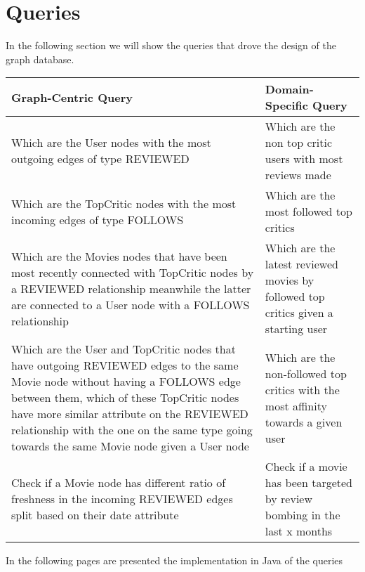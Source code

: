 \section{Queries}
In the following section we will show the queries that drove the design of the graph database.
\begin{center}
\begin{tabular}{|p{8cm} ||p{8cm}|}
\hline
Graph-Centric Query & Domain-Specific Query \\
\hline\hline
Which are the User nodes with the most outgoing edges of type REVIEWED & Which are the non top critic users with most reviews made\\
\hline
Which are the TopCritic nodes with the most incoming edges of type FOLLOWS & Which are the most followed top critics \\
\hline
Which are the Movies nodes that have been most recently connected with TopCritic nodes by a REVIEWED relationship meanwhile the latter are connected to a User node with a FOLLOWS relationship & Which are the latest reviewed movies by followed top critics given a starting user \\
\hline
Which are the User and TopCritic nodes that have outgoing REVIEWED edges to the same Movie node without having a FOLLOWS edge between them, which of these TopCritic nodes have more similar attribute on the REVIEWED relationship with the one on the same type going towards the same Movie node given a User node & Which are the non-followed top critics with the most affinity towards a given user\\
\hline
Check if a Movie node has different ratio of freshness in the incoming REVIEWED edges split based on their date attribute & Check if a movie has been targeted by review bombing in the last x months\\
\hline

\end{tabular}
\end{center}

In the following pages are presented the implementation in Java of the queries
